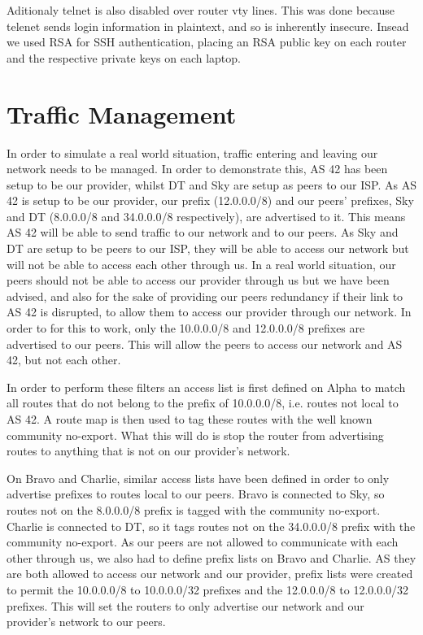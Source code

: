 Aditionaly telnet is also disabled over router vty lines. This was done because
telenet sends login information in plaintext, and so is inherently insecure.
Insead we used RSA for SSH authentication, placing an RSA public key on each
router and the respective private keys on each laptop.


\section{Traffic Management} In order to simulate a real world situation,
traffic entering and leaving our network needs to be managed. In order to
demonstrate this, AS 42 has been setup to be our provider, whilst DT and Sky are
setup as peers to our ISP. As AS 42 is setup to be our provider, our prefix
(12.0.0.0/8) and our peers' prefixes, Sky and DT (8.0.0.0/8 and 34.0.0.0/8
respectively), are advertised to it. This means AS 42 will be able to send
traffic to our network and to our peers. As Sky and DT are setup to be peers to
our ISP, they will be able to access our network but will not be able to access
each other through us. In a real world situation, our peers should not be able
to access our provider through us but we have been advised, and also for the
sake of providing our peers redundancy if their link to AS 42 is disrupted, to
allow them to access our provider through our network. In order to for this to
work, only the 10.0.0.0/8 and 12.0.0.0/8 prefixes are advertised to our peers.
This will allow the peers to access our network and AS 42, but not each other.

In order to perform these filters an access list is first defined on Alpha to
match all routes that do not belong to the prefix of 10.0.0.0/8, i.e. routes
not local to AS 42. A route map is then used to tag these routes with the well
known community no-export. What this will do is stop the router from advertising
routes to anything that is not on our provider's network.

On Bravo and Charlie, similar access lists have been defined in order to only
advertise prefixes to routes local to our peers. Bravo is connected to Sky, so
routes not on the 8.0.0.0/8 prefix is tagged with the community no-export.
Charlie is connected to DT, so it tags routes not on the 34.0.0.0/8 prefix with
the community no-export. As our peers are not allowed to communicate with each
other through us, we also had to define prefix lists on Bravo and Charlie. AS
they are both allowed to access our network and our provider, prefix lists were
created to permit the 10.0.0.0/8 to 10.0.0.0/32 prefixes and the 12.0.0.0/8 to
12.0.0.0/32 prefixes. This will set the routers to only advertise our network
and our provider's network to our peers.

